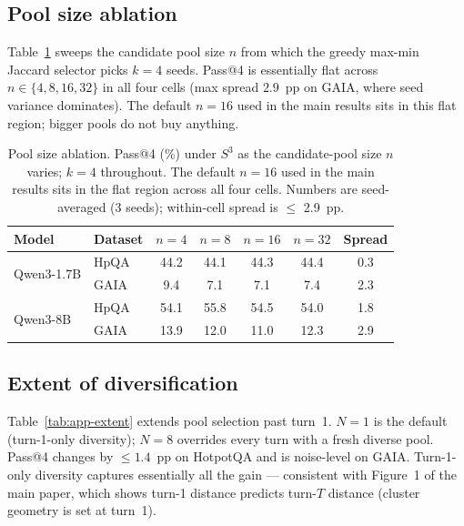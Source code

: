 \subsection{Pool size ablation}
\label{app:pool}

Table~\ref{tab:app-pool} sweeps the candidate pool size $n$ from
which the greedy max-min Jaccard selector picks $k{=}4$ seeds.
Pass@4 is essentially flat across $n \in \{4, 8, 16, 32\}$ in all
four cells (max spread $2.9$~pp on GAIA, where seed variance
dominates). The default $n{=}16$ used in the main results sits in
this flat region; bigger pools do not buy anything.

\begin{table}[t]
\centering
\small
\setlength{\tabcolsep}{6pt}
\renewcommand{\arraystretch}{1.05}
\begin{tabular}{l l *{4}{c} c}
\toprule
\textbf{Model} & \textbf{Dataset}
& $n{=}4$ & $n{=}8$ & $n{=}16$ & $n{=}32$ & Spread \\
\midrule
\multirow{2}{*}{Qwen3-1.7B}
 & HpQA & 44.2 & 44.1 & 44.3 & 44.4 & 0.3 \\
 & GAIA &  9.4 &  7.1 &  7.1 &  7.4 & 2.3 \\
\multirow{2}{*}{Qwen3-8B}
 & HpQA & 54.1 & 55.8 & 54.5 & 54.0 & 1.8 \\
 & GAIA & 13.9 & 12.0 & 11.0 & 12.3 & 2.9 \\
\bottomrule
\end{tabular}
\caption{Pool size ablation. Pass@4 (\%) under $S^3$ as the
candidate-pool size $n$ varies; $k{=}4$ throughout. The default
$n{=}16$ used in the main results sits in the flat region across
all four cells. Numbers are seed-averaged (3 seeds);
within-cell spread is $\le$ 2.9~pp.}
\label{tab:app-pool}
\end{table}

\subsection{Extent of diversification}
\label{app:extent}

Table~\ref{tab:app-extent} extends pool selection past turn~1.
$N{=}1$ is the default (turn-1-only diversity); $N{=}8$ overrides
every turn with a fresh diverse pool. Pass@4 changes by $\le 1.4$~pp
on HotpotQA and is noise-level on GAIA. Turn-1-only diversity
captures essentially all the gain --- consistent with Figure~1 of
the main paper, which shows turn-1 distance predicts turn-$T$
distance (cluster geometry is set at turn~1).

